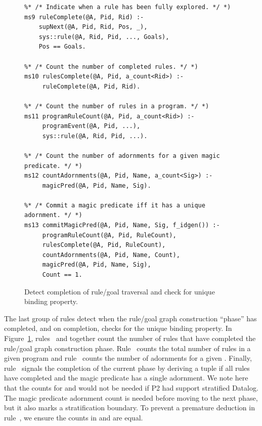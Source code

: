 \begin{figure}[!t]
\ssp
\centering
\begin{lstlisting}
%* /* Indicate when a rule has been fully explored. */ *)
ms9 ruleComplete(@A, Pid, Rid) :-
    supNext(@A, Pid, Rid, Pos, _),
    sys::rule(@A, Rid, Pid, ..., Goals),
    Pos == Goals. 
	       
%* /* Count the number of completed rules. */ *)
ms10 rulesComplete(@A, Pid, a_count<Rid>) :-
     ruleComplete(@A, Pid, Rid).
	        
%* /* Count the number of rules in a program. */ *)
ms11 programRuleCount(@A, Pid, a_count<Rid>) :-
     programEvent(@A, Pid, ...),
     sys::rule(@A, Rid, Pid, ...).
	
%* /* Count the number of adornments for a given magic predicate. */ *)
ms12 countAdornments(@A, Pid, Name, a_count<Sig>) :-
     magicPred(@A, Pid, Name, Sig).
	       
%* /* Commit a magic predicate iff it has a unique adornment. */ *)
ms13 commitMagicPred(@A, Pid, Name, Sig, f_idgen()) :-
     programRuleCount(@A, Pid, RuleCount),
     rulesComplete(@A, Pid, RuleCount),
     countAdornments(@A, Pid, Name, Count),
     magicPred(@A, Pid, Name, Sig),
     Count == 1.
\end{lstlisting}
\caption{\label{ch:magic:fig:magic4}Detect completion of rule/goal traversal 
and check for unique binding property.}
\end{figure}

The last group of rules detect when the rule/goal graph construction ``phase''
has completed, and on completion, checks for the unique binding property.  In
Figure~\ref{ch:magic:fig:magic4}, rules~ and  together count
the number of rules that have completed the rule/goal graph construction phase.
Rule~ counts the total number of rules in a given program and
rule~ counts the number of adornments for a given .
Finally, rule~ signals the completion of the current phase by deriving
a  tuple if all rules have completed and the magic
predicate has a single adornment.  We note here that the counts for
 and  would not be needed if P2 had
support stratified Datalog.  The magic predicate adornment count is needed
before moving to the next phase, but it also marks a stratification boundary.
To prevent a premature  deduction in rule~, we
ensure the counts in  and  are equal.


